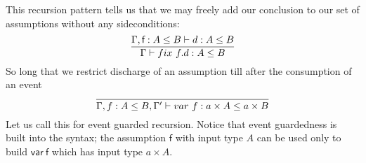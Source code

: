 \documentclass[a4paper,UKenglish,cleveref, autoref, thm-restate]{lipics-v2021}
\begin{document}
This recursion pattern tells us that we may freely add our conclusion to our set of assumptions without any sideconditions:
\[\infer{\contains{\Gamma}{\fix ~f.d}{A}{B}}{ \contains{\Gamma, \dslcom{f}: A \leq B}{d}{A}{B}}
\]
So long that we restrict discharge of an assumption till after the consumption of an event
\[\infer{\contains{\Gamma, \mathsf{f} : A \leq B, \Gamma'}{var~f}{a \times A}{a \times B}}{}
\]
Let us call this for event guarded recursion. Notice that event guardedness is built into the syntax; the assumption $\mathsf{f}$ with input type $A$ can be used only to build $\mathsf{var~f}$ which has input type $a \times A$.
\end{document}
